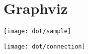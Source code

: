 \section{Graphviz}


{
\vspace{-1em}
\begin{center}
\texttt{[image: dot/sample]}
\end{center}
}


{
\vspace{-1em}
\begin{center}
\texttt{[image: dot/connection]}
\end{center}
}
